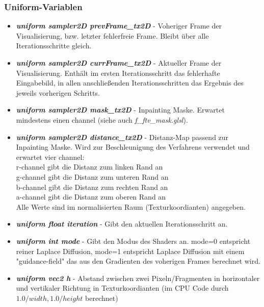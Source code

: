 \documentclass[10pt,a4paper,notitlepage]{article}
\begin{document}
\subsubsection*{Uniform-Variablen}
\begin{itemize}
\item \textbf{\textit{uniform sampler2D prevFrame\_tx2D}} - Voheriger Frame der Visualisierung, bzw. letzter fehlerfreie Frame. Bleibt über alle Iterationsschritte gleich.
\item \textbf{\textit{uniform sampler2D currFrame\_tx2D}} - Aktueller Frame der Visualisierung. Enthält im ersten Iterationsschritt das fehlerhafte Eingabebild, in allen anschließenden Iterationsschritten das Ergebnis des jeweils vorherigen Schritts.
\item \textbf{\textit{uniform sampler2D mask\_tx2D}} - Inpainting Maske. Erwartet mindestens einen channel (siehe auch \textit{f\_ftv\_mask.glsl}).
\item \textbf{\textit{uniform sampler2D distance\_tx2D}} - Distanz-Map passend zur Inpainting Maske. Wird zur Beschleunigung des Verfahrens verwendet und erwartet vier channel:\\
r-channel gibt die Distanz zum linken Rand an\\
g-channel gibt die Distanz zum unteren Rand an\\
b-channel gibt die Distanz zum rechten Rand an\\
a-channel gibt die Distanz zum oberen Rand an\\
Alle Werte sind im normalisierten Raum (Texturkoordianten) angegeben.
\item \textbf{\textit{uniform float iteration}} - Gibt den aktuellen Iterationsschritt an.
\item \textbf{\textit{uniform int mode}} - Gibt den Modus des Shaders an. mode=0 entspricht reiner Laplace Diffusion, mode=1 entspricht Laplace Diffusion mit einem "guidance-field" das aus den Gradienten des voherigen Frames berechnet wird.
\item \textbf{\textit{uniform vec2 h}} - Abstand zwischen zwei Pixeln/Fragmenten in horizontaler und vertikaler Richtung in Texturkoordianten (im CPU Code durch $1.0/width,1.0/height$ berechnet)
\end{itemize}
\end{document}
